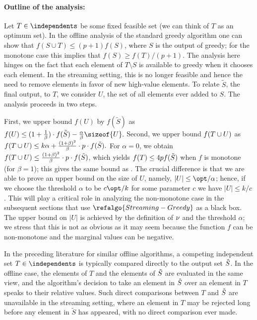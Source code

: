 \documentclass[oneside,letterpaper]{scrartcl} \usepackage{macros}
\begin{document}
\paragraph{Outline of the analysis:} Let $T \in \independents$ be some
fixed feasible set (we can think of $T$ as an optimum set).  In the
offline analysis of the standard greedy algorithm one can show that
$f(S \cup T) \le (p+1) f(S)$, where $S$ is the output of greedy; for
the monotone case this implies that $f(S) \ge f(T)/(p+1)$.  The
analysis here hinges on the fact that each element of $T \setminus S$
is available to greedy when it chooses each element.  In the streaming
setting, this is no longer feasible and hence the need to remove
elements in favor of new high-value elements.  To relate $\tilde{S}$,
the final output, to $T$, we consider $U$, the set of all elements
ever added to $S$. The analysis proceeds in two steps.

First, we upper bound $f(U)$ by $f(\tilde{S})$ as \begin{math}
f(U) \leq (1+ \frac{1}{\beta}) \cdot f(\finalset) - \frac{\alpha}{\beta}
  \sizeof{U}.
\end{math}
Second, we upper bound $f(T \cup U)$ as \begin{math}
f(T \cup U) \leq k \alpha + \frac{(1 + \beta)^2}{\beta} \cdot p \cdot f(\tilde{S}).
\end{math}
For $\alpha = 0$, we obtain $f(T \cup U) \le \frac{(1 +
  \beta)^2}{\beta} \cdot p \cdot f(\tilde{S})$, which yields $f(T) \le
4p f(\tilde{S})$ when $f$ is monotone (for $\beta = 1$); this gives
the same bound as \cite{ck-smms-14}.  The crucial difference is that
we are able to prove an upper bound on the size of $U$, namely,
$|\takens| \le \opt/\alpha$; hence, if we choose the threshold
$\alpha$ to be $c \opt/k$ for some parameter $c$ we have $|U| \le
k/c$. This will play a critical role in analyzing the non-monotone
case in the subsequent sections that use $\refalgo{Streaming-Greedy}$
as a black box. The upper bound on $|U|$ is achieved by the definition
of $\nu$ and the threshold $\alpha$; we stress that this is not
as obvious as it may seem because the function $f$ can be non-monotone
and the marginal values can be negative.



\iffalse In the preceding literature for similar offline algorithms, a
competing independent set $T \in \independents$ is typically compared
directly to the output set $\tilde{S}$. In the offline case, the
elements of $T$ and the elements of $\tilde{S}$ are evaluated in the
same view, and the algorithm's decision to take an element in
$\tilde{S}$ over an element in $T$ speaks to their relative
values. Such direct comparisons between $T$ and $\tilde{S}$ are
unavailable in the streaming setting, where an element in $T$ may be
rejected long before any element in $\tilde{S}$ has appeared, with no
direct comparison ever made.
\end{document}
